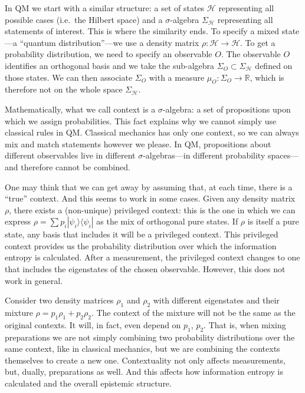 \documentclass[twocolumn,prl,floatfix,superscriptaddress]{revtex4-2}
\begin{document}
In QM we start with a similar structure: a set of states $\mathcal{H}$ representing all possible cases (i.e.\ the Hilbert space) and a $\sigma$-algebra $\Sigma_{\mathcal{H}}$ representing all statements of interest. This is where the similarity ends. To specify a mixed state---a ``quantum distribution''---we use a density matrix $\rho : \mathcal{H} \to \mathcal{H}$. To get a probability distribution, we need to specify an observable $O$. The observable $O$ identifies an orthogonal basis and we take the sub-algebra $\Sigma_O \subset \Sigma_{\mathcal{H}}$ defined on those states. We can then associate $\Sigma_O$ with a measure $\mu_O : \Sigma_O \to \mathbb{R}$, which is therefore not on the whole space $\Sigma_{\mathcal{H}}$.

Mathematically, what we call context is a $\sigma$-algebra: a set of propositions upon which we assign probabilities. This fact explains why we cannot simply use classical rules in QM. Classical mechanics has only one context, so we can always mix and match statements however we please. In QM, propositions about different observables live in different $\sigma$-algebras---in different probability spaces---and therefore cannot be combined.

One may think that we can get away by assuming that, at each time, there is a ``true'' context. And this seems to work in some cases. Given any density matrix $\rho$, there exists a (non-unique) privileged context: this is the one in which we can express $\rho = \sum p_i |\psi_i \rangle \langle \psi_i|$ as the mix of orthogonal pure states. If $\rho$ is itself a pure state, any basis that includes it will be a privileged context. This privileged context provides us the probability distribution over which the information entropy is calculated. After a measurement, the privileged context changes to one that includes the eigenstates of the chosen observable. However, this does not work in general.

Consider two density matrices $\rho_1$ and $\rho_2$ with different eigenstates and their mixture $\rho = p_1 \rho_1 + p_2 \rho_2$. The context of the mixture will not be the same as the original contexts. It will, in fact, even depend on $p_1$, $p_2$. That is, when mixing preparations we are not simply combining two probability distributions over the same context, like in classical mechanics, but we are combining the contexts themselves to create a new one. Contextuality not only affects measurements, but, dually, preparations as well. And this affects how information entropy is calculated and the overall epistemic structure.
\end{document}
